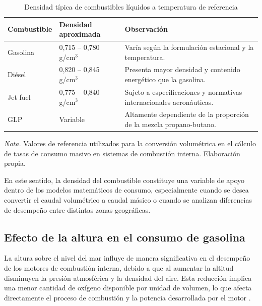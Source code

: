 \begin{table}[h]
	\centering
	\captionsetup{labelformat=simple, labelsep=newline, textfont=it, labelfont=bf}
	\caption{Densidad típica de combustibles líquidos a temperatura de referencia}
	\label{tab:densidad}
	\vspace{0.3cm}
	
	\begin{tabularx}{\linewidth}{p{3.5cm} p{4.5cm} X}
		\toprule %
		\rowcolor[rgb]{0.851, 0.851, 0.851}
		\textbf{Combustible} & \textbf{Densidad aproximada} & \textbf{Observación} \\
		\midrule %
		Gasolina & 0,715 -- 0,780 g/cm$^{3}$ & Varía según la formulación estacional y la temperatura. \\
		\addlinespace
		Diésel & 0,820 -- 0,845 g/cm$^{3}$ & Presenta mayor densidad y contenido energético que la gasolina. \\
		\addlinespace
		Jet fuel & 0,775 -- 0,840 g/cm$^{3}$ & Sujeto a especificaciones y normativas internacionales aeronáuticas. \\
		\addlinespace
		GLP & Variable & Altamente dependiente de la proporción de la mezcla propano-butano. \\
		\bottomrule %
	\end{tabularx}
	\vspace{0.2cm}
	
	\begin{flushleft}
		\footnotesize \textit{Nota.} Valores de referencia utilizados para la conversión volumétrica en el cálculo de tasas de consumo masivo en sistemas de combustión interna. Elaboración propia.
	\end{flushleft}
\end{table}

En este sentido, la densidad del combustible constituye una variable de apoyo dentro de los modelos matemáticos de consumo, especialmente cuando se desea convertir el caudal volumétrico a caudal másico o cuando se analizan diferencias de desempeño entre distintas zonas geográficas.

\subsection{Efecto de la altura en el consumo de gasolina}

La altura sobre el nivel del mar influye de manera significativa en el desempeño de los motores de combustión interna, debido a que al aumentar la altitud disminuyen la presión atmosférica y la densidad del aire. Esta reducción implica una menor cantidad de oxígeno disponible por unidad de volumen, lo que afecta directamente el proceso de combustión y la potencia desarrollada por el motor \citep{LopezRuano2018}.

